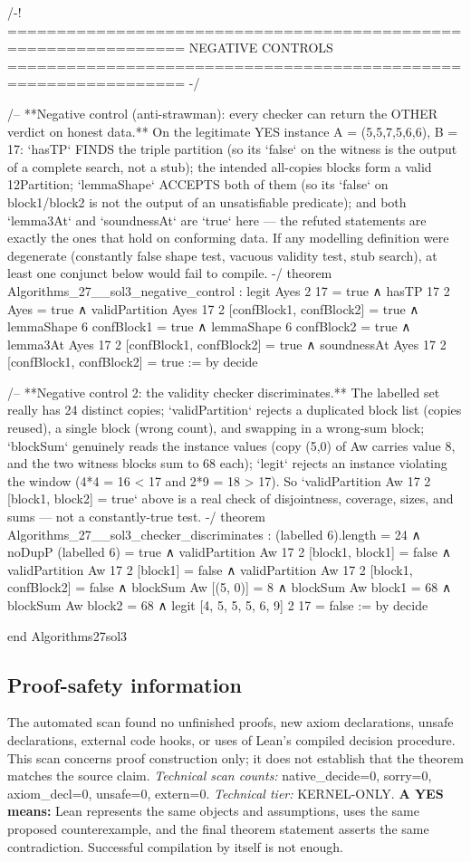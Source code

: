 \documentclass[11pt]{article}
\begin{document}
\begin{Vlean}
/-! ================================================================
    NEGATIVE CONTROLS
    ================================================================ -/

/-- **Negative control (anti-strawman): every checker can return the OTHER
verdict on honest data.**  On the legitimate YES instance A = (5,5,7,5,6,6),
B = 17: `hasTP` FINDS the triple partition (so its `false` on the witness is
the output of a complete search, not a stub); the intended all-copies blocks
form a valid 12Partition; `lemmaShape` ACCEPTS both of them (so its `false`
on block1/block2 is not the output of an unsatisfiable predicate); and both
`lemma3At` and `soundnessAt` are `true` here — the refuted statements are
exactly the ones that hold on conforming data.  If any modelling definition
were degenerate (constantly false shape test, vacuous validity test, stub
search), at least one conjunct below would fail to compile. -/
theorem Algorithms_27__sol3_negative_control :
    legit Ayes 2 17 = true
  ∧ hasTP 17 2 Ayes = true
  ∧ validPartition Ayes 17 2 [confBlock1, confBlock2] = true
  ∧ lemmaShape 6 confBlock1 = true
  ∧ lemmaShape 6 confBlock2 = true
  ∧ lemma3At Ayes 17 2 [confBlock1, confBlock2] = true
  ∧ soundnessAt Ayes 17 2 [confBlock1, confBlock2] = true := by
  decide

/-- **Negative control 2: the validity checker discriminates.**  The labelled
set really has 24 distinct copies; `validPartition` rejects a duplicated
block list (copies reused), a single block (wrong count), and swapping in a
wrong-sum block; `blockSum` genuinely reads the instance values (copy (5,0)
of Aw carries value 8, and the two witness blocks sum to 68 each); `legit`
rejects an instance violating the window (4*4 = 16 < 17 and 2*9 = 18 > 17).
So `validPartition Aw 17 2 [block1, block2] = true` above is a real check of
disjointness, coverage, sizes, and sums — not a constantly-true test. -/
theorem Algorithms_27__sol3_checker_discriminates :
    (labelled 6).length = 24
  ∧ noDupP (labelled 6) = true
  ∧ validPartition Aw 17 2 [block1, block1] = false
  ∧ validPartition Aw 17 2 [block1] = false
  ∧ validPartition Aw 17 2 [block1, confBlock2] = false
  ∧ blockSum Aw [(5, 0)] = 8
  ∧ blockSum Aw block1 = 68
  ∧ blockSum Aw block2 = 68
  ∧ legit [4, 5, 5, 5, 6, 9] 2 17 = false := by
  decide

end Algorithms27sol3

\end{Vlean}
\subsection*{Proof-safety information}
The automated scan found no unfinished proofs, new axiom declarations, unsafe declarations, external code hooks, or uses of Lean's compiled decision procedure. This scan concerns proof construction only; it does not establish that the theorem matches the source claim.
\textit{Technical scan counts:} native\_decide=0, sorry=0, axiom\_decl=0, unsafe=0, extern=0. \textit{Technical tier:} KERNEL-ONLY.
\textbf{A YES means:} Lean represents the same objects and assumptions, uses the same proposed counterexample, and the final theorem statement asserts the same contradiction. Successful compilation by itself is not enough.
\clearpage
\end{document}
